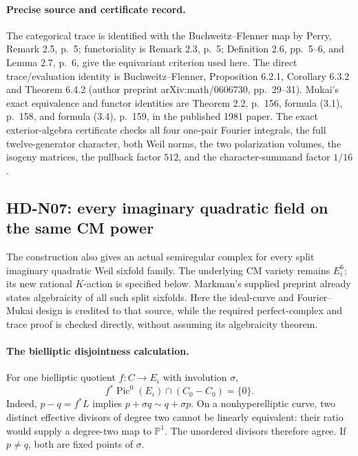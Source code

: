 \paragraph{Precise source and certificate record.}
The categorical trace is identified with the Buchweitz--Flenner map
by Perry, Remark 2.5, p.~5; functoriality is Remark 2.3, p.~5;
Definition 2.6, pp.~5--6, and Lemma 2.7, p.~6, give the equivariant
criterion used here. The direct trace/evaluation identity is
Buchweitz--Flenner, Proposition 6.2.1, Corollary 6.3.2 and Theorem 6.4.2
(author preprint arXiv:math/0606730, pp.~29--31). Mukai's exact
equivalence and functor identities are Theorem 2.2, p.~156, formula
(3.1), p.~158, and formula (3.4), p.~159, in the published 1981 paper.
The exact exterior-algebra certificate checks all four one-pair
Fourier integrals, the full twelve-generator character, both Weil
norms, the two polarization volumes, the isogeny matrices, the
pullback factor $512$, and the character-summand factor $1/16$.

\subsection{HD-N07: every imaginary quadratic field on the same CM power}
\label{hd-n07}

The construction also gives an actual semiregular complex for every
split imaginary quadratic Weil sixfold family. The underlying CM
variety remains $E_i^6$; its new rational $K$-action is specified below.
Markman's supplied preprint already states algebraicity of all such
split sixfolds. Here the ideal-curve and Fourier--Mukai design is
credited to that source, while the required perfect-complex and trace
proof is checked directly, without assuming its algebraicity theorem.

\paragraph{The bielliptic disjointness calculation.}
For one bielliptic quotient $f:C\to E_i$ with involution $\sigma$,
\begin{equation}\label{hd-n-bielliptic-intersection}
 f^*\operatorname{Pic}^0(E_i)\cap(C_0-C_0)=\{0\}.
\end{equation}
Indeed, $p-q=f^*L$ implies
$p+\sigma q\sim q+\sigma p$. On a nonhyperelliptic curve, two
distinct effective divisors of degree two cannot be linearly equivalent:
their ratio would supply a degree-two map to $\mathbb P^1$.
The unordered divisors therefore agree. If $p\ne q$, both are fixed
points of $\sigma$.

